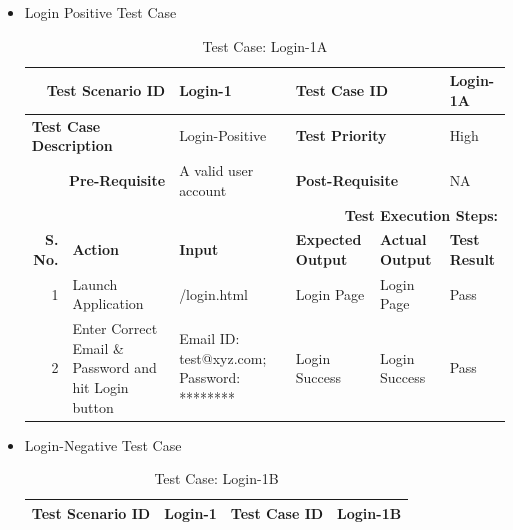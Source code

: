 \documentclass[a4paper, hidelinks, 12pt]{report}
\begin{document}
\begin{itemize}
\item{Login Positive Test Case}
\begin{table}[H]
  \centering
  \caption{Test Case: Login-1A}
    \begin{tabular}{|r|p{4.355em}|p{7.715em}|p{6.43em}|p{5.855em}|p{5.07em}|}
    \toprule
    \multicolumn{2}{|p{13.425em}|}{\textbf{Test Scenario ID}} & Login-1 & \multicolumn{2}{p{12.285em}|}{\textbf{Test Case ID}} & Login-1A \\
    \midrule
    \multicolumn{2}{|l|}{\multirow{2}[2]{*}{\textbf{Test Case Description}}} & \multirow{2}[2]{*}{Login-Positive} & \multicolumn{2}{l|}{\multirow{2}[2]{*}{\textbf{Test Priority}}} & \multirow{2}[2]{*}{High} \\
    \multicolumn{2}{|l|}{} & \multicolumn{1}{l|}{} & \multicolumn{2}{l|}{} & \multicolumn{1}{l|}{} \\
    \midrule
    \multicolumn{2}{|p{13.425em}|}{\textbf{Pre-Requisite}} & A valid user account & \multicolumn{2}{p{12.285em}|}{\textbf{Post-Requisite}} & NA \\
    \midrule
    \multicolumn{6}{p{38.495em}|}{\textbf{Test Execution Steps:}} \\
    \midrule
    \multicolumn{1}{|p{5.07em}|}{\textbf{S. No.}} & \textbf{Action } & \textbf{Input} & \textbf{Expected Output} & \textbf{Actual Output} & \textbf{Test Result} \\
    \midrule
    1     & Launch Application & /login.html & Login Page & Login Page & Pass \\
    \midrule
    2     & Enter Correct Email \& Password and hit Login button & Email ID: test@xyz.com; Password: ******** & Login Success & Login Success & Pass \\
    \bottomrule
    \end{tabular}%
  \label{tab:Text case: Login-1A}%
\end{table}%
\item{Login-Negative Test Case}
\begin{table}[H]
  \centering
  \caption{Test Case: Login-1B}
    \begin{tabular}{|r|p{4.355em}|p{7.715em}|p{6.43em}|p{5.855em}|p{5.07em}|}
    \toprule
    \multicolumn{2}{|p{13.425em}|}{\textbf{Test Scenario ID}} & Login-1 & \multicolumn{2}{p{12.285em}|}{\textbf{Test Case ID}} & Login-1B \\
    \midrule

\end{tabular}
\end{table}
\end{itemize}
\end{document}
